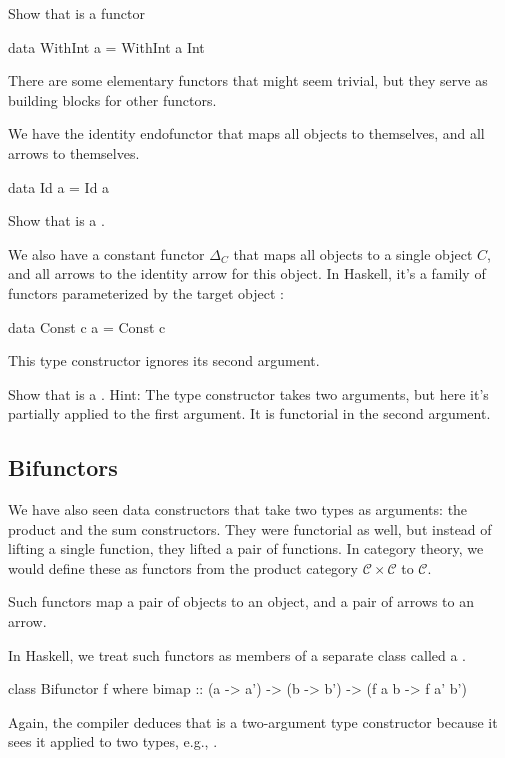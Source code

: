 \documentclass[DaoFP]{subfiles}
\begin{document}
\begin{exercise}
Show that  is a functor
\begin{haskell}
data WithInt a = WithInt a Int
\end{haskell}
\end{exercise}

There are some elementary functors that might seem trivial, but they serve as building blocks for other functors. 

We have the identity endofunctor that maps all objects to themselves, and all arrows to themselves. 
\begin{haskell}
data Id a = Id a
\end{haskell}
\begin{exercise}
Show that  is a .
\end{exercise}


We also have a constant functor $\Delta_C$ that maps all objects to a single object $C$, and all arrows to the identity arrow for this object. In Haskell, it's a family of functors parameterized by the target object :
\begin{haskell}
data Const c a = Const c
\end{haskell}
This type constructor ignores its second argument.


\begin{exercise}
Show that  is a . Hint: The type constructor takes two arguments, but here it's partially applied to the first argument. It is functorial in the second argument.
\end{exercise}


\subsection{Bifunctors}

We have also seen data constructors that take two types as arguments: the product and the sum constructors. They were functorial as well, but instead of lifting a single function, they lifted a pair of functions. In category theory, we would define these as functors from the product category $\mathcal{C} \times \mathcal{C}$ to $\mathcal{C}$.

Such functors map a pair of objects to an object, and a pair of arrows to an arrow. 

In Haskell, we treat such functors as members of a separate class called a .

\begin{haskell}
class Bifunctor f where
  bimap :: (a -> a') -> (b -> b') -> (f a b -> f a' b')
\end{haskell}
Again, the compiler deduces that  is a two-argument type constructor because it sees it applied to two types, e.g., .
\end{document}
